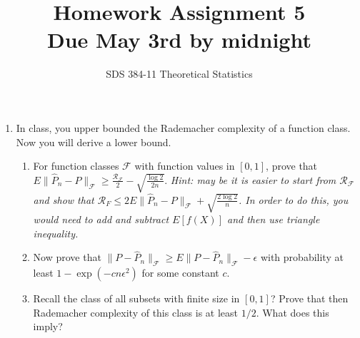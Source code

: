 \documentclass[11pt]{article}
\newcommand{\F}{\mathcal{F}}
\newcommand{\R}{\mathcal{R}}
\begin{document}
\title{{\bf Homework Assignment 5}\\Due  May 3rd by  midnight} %
\author{SDS 384-11 Theoretical Statistics}

\date{}

\maketitle{}
\begin{enumerate}%


\item In class, you upper bounded the Rademacher complexity of a function class. Now you will derive a lower bound.
\begin{enumerate}
	\item For function classes $\F$ with function values in $[0,1]$, prove that $E\|\hat{P}_n-P\|_\F\geq \frac{\R_\F}{2}-\sqrt{\frac{\log 2}{2n}}$.
	\textit{Hint: may be it is easier to start from $\R_\F$ and show that $\R_F\leq 2E\|\hat{P}_n-P\|_\F+\sqrt{\frac{2\log 2}{n}}$. In order to do this, you would need to add and subtract $E[f(X)]$ and then use triangle inequality.}
	\item Now prove that $\|P-\hat{P}_n\|_\F\geq E\|P-\hat{P}_n\|_\F-\epsilon$ with probability at least $1-\exp(-cn\epsilon^2)$ for some constant $c$.
	\item Recall the class of all subsets with finite size in $[0,1]$? Prove that then Rademacher complexity of this class is at least $1/2$. What does this imply?
\end{enumerate}


\end{enumerate}
\end{document}
